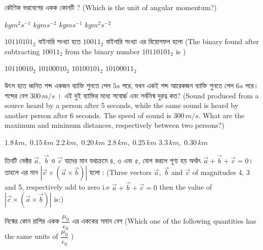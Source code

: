 \documentclass[addpoints]{exam}
\begin{document}
\begin{questions}
\question  কৌণিক ভরবেগের একক কোনটি ? (Which is the unit of angular momentum?)

\begin{oneparchoices}
\choice $ kgm^{2}s^{-1} $
\choice $ kgms^{-2} $
\choice $ kgms^{-1} $
\choice $ kgm^{2}s^{-2} $

\end{oneparchoices}

\question  $ 10110101_{2} $ বাইনারি সংখ্যা হতে $ 10011_{2} $ বাইনারি সংখ্যা এর বিয়োগফল হলো (The binary found after subtracting $ 10011_{2} $ from the binary number $ 10110101_{2} $ is )

\begin{oneparchoices}
\choice $ 10110010_{2} $
\choice $ 10100010_{2} $
\choice $ 10100101_{2} $
\choice $ 10100011_{2} $

\end{oneparchoices}


\question  উৎস হতে ধ্বনিত শব্দ একজন ব্যাক্তি শুনতে পেল $ 5s $ পরে, যখন একই শব্দ আরেকজন ব্যাক্তি শুনতে পেল $ 6s $ পরে। শব্দের বেগ $ 300\,m/s $ । এই দুই ব্যাক্তির মধ্যে সবোর্চ্চ এবং সর্বনিন্ম দুরত্ব কত? (Sound produced from a source heard by a person after 5 seconds, while the same sound is heard by another person after 6 seconds. The speed of sound is $ 300\,m/s  $. What are the maximum and minimum distances, respectively between two persons?)

\begin{oneparchoices}
\choice $ 1.8\,km,\; 0.15\,km$
\choice $ 2.2\,km,\; 0.20\,km $
\choice $ 2.8\,km,\; 0.25\,km $
\choice  $ 3.3\,km,\; 0.30\,km $
\end{oneparchoices}



\question  তিনটি ভেক্টর $ \vec{a},\; \vec{b} $ ও $ \vec{c} $ যাদের মান যথাক্রমে ৪, ৩  এবং ৫, যোগ করলে শূণ্য হয় অর্থাৎ $ \vec{a}+\vec{b}+\vec{c} =0  $। তাহলে এর মান $ |\vec{c}\times (\vec{a}\times \vec{b})| $ হলো : (Three vectors $ \vec{a},\; \vec{b} $ and $ \vec{c} $ of magnitudes 4, 3 and 5, respectively add to zero i.e $ \vec{a}+\vec{b}+\vec{c} =0  $ then the value of $ |\vec{c}\times (\vec{a}\times \vec{b})| $ is:)

\begin{oneparchoices}
\end{oneparchoices}

\question  নিন্মের কোন রাশির একক $ \dfrac{\mu_{0}}{\epsilon_{0}} $ এর এককের সমান বেগ (Which one of the following quantities has the same units of $ \dfrac{\mu_{0}}{\epsilon_{0}} $ )


\end{questions}
\end{document}
